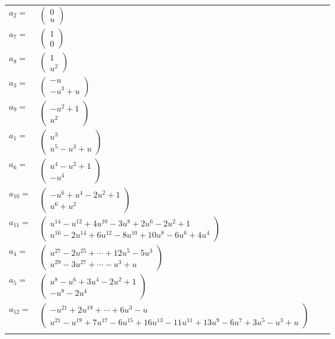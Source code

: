\documentclass[1p]{elsarticle_modified}
\theoremstyle{definition}
\begin{document}
\begin{tabular}{m{7pt} m{180pt} m{7pt} m{180pt} }
\flushright $a_{2}=$&$\begin{pmatrix}0\\u\end{pmatrix}$ \\
\flushright $a_{7}=$&$\begin{pmatrix}1\\0\end{pmatrix}$ \\
\flushright $a_{8}=$&$\begin{pmatrix}1\\u^2\end{pmatrix}$ \\
\flushright $a_{3}=$&$\begin{pmatrix}- u\\- u^3+u\end{pmatrix}$ \\
\flushright $a_{9}=$&$\begin{pmatrix}- u^2+1\\u^2\end{pmatrix}$ \\
\flushright $a_{1}=$&$\begin{pmatrix}u^3\\u^5- u^3+u\end{pmatrix}$ \\
\flushright $a_{6}=$&$\begin{pmatrix}u^4- u^2+1\\- u^4\end{pmatrix}$ \\
\flushright $a_{10}=$&$\begin{pmatrix}- u^6+u^4-2 u^2+1\\u^6+u^2\end{pmatrix}$ \\
\flushright $a_{11}=$&$\begin{pmatrix}u^{14}- u^{12}+4 u^{10}-3 u^8+2 u^6-2 u^2+1\\u^{16}-2 u^{14}+6 u^{12}-8 u^{10}+10 u^8-6 u^6+4 u^4\end{pmatrix}$ \\
\flushright $a_{4}=$&$\begin{pmatrix}u^{27}-2 u^{25}+\cdots+12 u^5-5 u^3\\u^{29}-3 u^{27}+\cdots- u^3+u\end{pmatrix}$ \\
\flushright $a_{5}=$&$\begin{pmatrix}u^8- u^6+3 u^4-2 u^2+1\\- u^8-2 u^4\end{pmatrix}$ \\
\flushright $a_{12}=$&$\begin{pmatrix}- u^{21}+2 u^{19}+\cdots+6 u^3- u\\u^{21}- u^{19}+7 u^{17}-6 u^{15}+16 u^{13}-11 u^{11}+13 u^9-6 u^7+3 u^5- u^3+u\end{pmatrix}$\\&\end{tabular}
\end{document}
